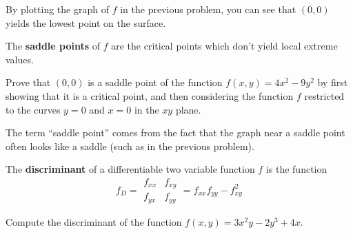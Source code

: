 \documentclass[letterpaper, twoside, 12pt]{book}
\begin{document}
\begin{remark}
  By plotting the graph of $f$ in the previous problem, you can see
  that $(0,0)$ yields the lowest point on the surface.
\end{remark}

\begin{definition}
  The \textbf{saddle points} of $f$ are the critical points which don't yield local extreme values.
\end{definition}

          \begin{problem}
            Prove that $(0,0)$ is a saddle point of the function
            $f(x,y)=4x^2-9y^2$ by first showing that it is a critical point,
            and then considering the function $f$ restricted to the curves $y=0$
            and $x=0$ in the $xy$ plane.
          \end{problem}

          \begin{solution}

          \end{solution}

\begin{remark}
  The term ``saddle point'' comes from the fact that the graph near a
  saddle point often looks like a saddle (such as in the previous problem).
\end{remark}

\begin{definition}
  The \textbf{discriminant} of a differentiable two variable function
  $f$ is the function
  \[
    f_D
      =
    \begin{array}{|cc|}f_{xx}&f_{xy}\\f_{yx}&f_{yy}\end{array}
      =
    f_{xx}f_{yy} - f_{xy}^2
  \]
\end{definition}

          \begin{problem}
            Compute the discriminant of the function
            $f(x,y)=3x^2y-2y^3+4x$.
          \end{problem}

          \begin{solution}

          \end{solution}
\end{document}
